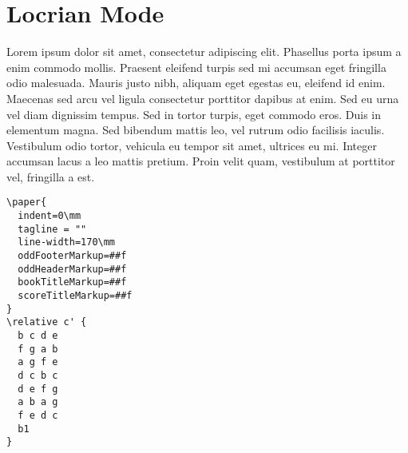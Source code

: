 \documentclass[11pt]{article}
\begin{document}
\section*{Locrian Mode}
\label{sec:orgfe9ca7e}

Lorem ipsum dolor sit amet, consectetur adipiscing elit. Phasellus
porta ipsum a enim commodo mollis. Praesent eleifend turpis sed mi
accumsan eget fringilla odio malesuada. Mauris justo nibh, aliquam
eget egestas eu, eleifend id enim. Maecenas sed arcu vel ligula
consectetur porttitor dapibus at enim. Sed eu urna vel diam dignissim
tempus. Sed in tortor turpis, eget commodo eros. Duis in elementum
magna. Sed bibendum mattis leo, vel rutrum odio facilisis iaculis.
Vestibulum odio tortor, vehicula eu tempor sit amet, ultrices eu mi.
Integer accumsan lacus a leo mattis pretium. Proin velit quam,
vestibulum at porttitor vel, fringilla a est.

\begin{verbatim}
\paper{
  indent=0\mm
  tagline = ""
  line-width=170\mm
  oddFooterMarkup=##f
  oddHeaderMarkup=##f
  bookTitleMarkup=##f
  scoreTitleMarkup=##f
}
\relative c' {
  b c d e
  f g a b
  a g f e
  d c b c
  d e f g
  a b a g
  f e d c
  b1
}
\end{verbatim}
\end{document}
